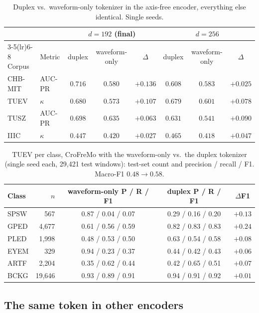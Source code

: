\begin{table}[t]
\centering
\small
\caption{Duplex vs.\ waveform-only tokenizer in the axis-free encoder,
everything else identical. Single seeds.}
\label{tab:attribution}
\begin{tabular}{llcccccc}
\toprule
 & & \multicolumn{3}{c}{$d{=}192$ (final)} & \multicolumn{3}{c}{$d{=}256$} \\
\cmidrule(lr){3-5}\cmidrule(lr){6-8}
Corpus & Metric & duplex & waveform-only & $\Delta$ & duplex & waveform-only & $\Delta$ \\
\midrule
CHB-MIT & AUC-PR & $\mathbf{0.716}$ & $0.580$ & $\mathbf{+0.136}$ & $0.608$ & $0.583$ & $+0.025$ \\
TUEV & $\kappa$ & $\mathbf{0.680}$ & $0.573$ & $\mathbf{+0.107}$ & $0.679$ & $0.601$ & $+0.078$ \\
TUSZ & AUC-PR & $\mathbf{0.698}$ & $0.635$ & $\mathbf{+0.063}$ & $0.631$ & $0.541$ & $+0.090$ \\
IIIC & $\kappa$ & $\mathbf{0.447}$ & $0.420$ & $+0.027$ & $0.465$ & $0.418$ & $+0.047$ \\
\bottomrule
\end{tabular}
\end{table}

\begin{table}[t]
\centering
\small
\caption{TUEV per class, CroFreMo with the waveform-only vs.\ the duplex
tokenizer (single seed each, 29,421 test windows): test-set count and
precision / recall / F1. Macro-F1 $0.48 \to 0.58$.}
\label{tab:perclass}
\begin{tabular}{lrccc}
\toprule
Class & $n$ & waveform-only P / R / F1 & duplex P / R / F1 & $\Delta$F1 \\
\midrule
SPSW & 567 & 0.87 / 0.04 / 0.07 & 0.29 / 0.16 / 0.20 & $+0.13$ \\
GPED & 4,677 & 0.61 / 0.56 / 0.59 & 0.82 / 0.83 / 0.83 & $+0.24$ \\
PLED & 1,998 & 0.48 / 0.53 / 0.50 & 0.63 / 0.54 / 0.58 & $+0.08$ \\
EYEM & 329 & 0.94 / 0.23 / 0.37 & 0.44 / 0.42 / 0.43 & $+0.06$ \\
ARTF & 2,204 & 0.35 / 0.62 / 0.44 & 0.42 / 0.65 / 0.51 & $+0.07$ \\
BCKG & 19,646 & 0.93 / 0.89 / 0.91 & 0.94 / 0.91 / 0.92 & $+0.01$ \\
\bottomrule
\end{tabular}
\end{table}


\subsection{The same token in other encoders}
\label{sec:content-structure}

